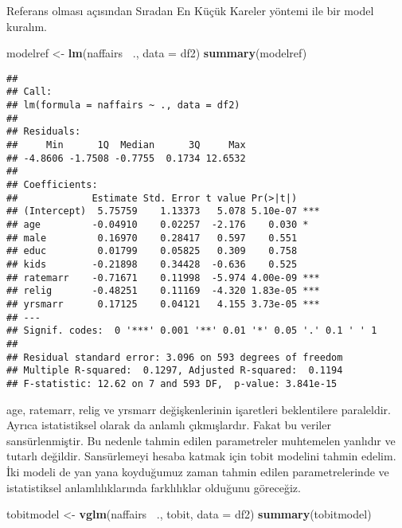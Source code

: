 \documentclass[
]{book}
\newenvironment{Shaded}{\begin{snugshade}}{\end{snugshade}}
\newcommand{\DataTypeTok}[1]{\textcolor[rgb]{0.13,0.29,0.53}{#1}}
\newcommand{\KeywordTok}[1]{\textcolor[rgb]{0.13,0.29,0.53}{\textbf{#1}}}
\newcommand{\NormalTok}[1]{#1}
\newcommand{\OperatorTok}[1]{\textcolor[rgb]{0.81,0.36,0.00}{\textbf{#1}}}
\newcommand{\StringTok}[1]{\textcolor[rgb]{0.31,0.60,0.02}{#1}}
\begin{document}
Referans olması açısından Sıradan En Küçük Kareler yöntemi ile bir model kuralım.

\begin{Shaded}
\begin{Highlighting}[]
\NormalTok{modelref <-}\StringTok{ }\KeywordTok{lm}\NormalTok{(naffairs }\OperatorTok{~}\NormalTok{., }\DataTypeTok{data =}\NormalTok{ df2)}
\KeywordTok{summary}\NormalTok{(modelref)}
\end{Highlighting}
\end{Shaded}

\begin{verbatim}
## 
## Call:
## lm(formula = naffairs ~ ., data = df2)
## 
## Residuals:
##     Min      1Q  Median      3Q     Max 
## -4.8606 -1.7508 -0.7755  0.1734 12.6532 
## 
## Coefficients:
##             Estimate Std. Error t value Pr(>|t|)    
## (Intercept)  5.75759    1.13373   5.078 5.10e-07 ***
## age         -0.04910    0.02257  -2.176    0.030 *  
## male         0.16970    0.28417   0.597    0.551    
## educ         0.01799    0.05825   0.309    0.758    
## kids        -0.21898    0.34428  -0.636    0.525    
## ratemarr    -0.71671    0.11998  -5.974 4.00e-09 ***
## relig       -0.48251    0.11169  -4.320 1.83e-05 ***
## yrsmarr      0.17125    0.04121   4.155 3.73e-05 ***
## ---
## Signif. codes:  0 '***' 0.001 '**' 0.01 '*' 0.05 '.' 0.1 ' ' 1
## 
## Residual standard error: 3.096 on 593 degrees of freedom
## Multiple R-squared:  0.1297, Adjusted R-squared:  0.1194 
## F-statistic: 12.62 on 7 and 593 DF,  p-value: 3.841e-15
\end{verbatim}

age, ratemarr, relig ve yrsmarr değişkenlerinin işaretleri beklentilere paraleldir. Ayrıca istatistiksel olarak da anlamlı çıkmışlardır. Fakat bu veriler sansürlenmiştir. Bu nedenle tahmin edilen parametreler muhtemelen yanlıdır ve tutarlı değildir. Sansürlemeyi hesaba katmak için tobit modelini tahmin edelim. İki modeli de yan yana koyduğumuz zaman tahmin edilen parametrelerinde ve istatistiksel anlamlılıklarında farklılıklar olduğunu göreceğiz.

\begin{Shaded}
\begin{Highlighting}[]
\NormalTok{tobitmodel <-}\StringTok{ }\KeywordTok{vglm}\NormalTok{(naffairs }\OperatorTok{~}\NormalTok{., tobit, }\DataTypeTok{data =}\NormalTok{ df2)}
\KeywordTok{summary}\NormalTok{(tobitmodel)}
\end{Highlighting}
\end{Shaded}
\end{document}
